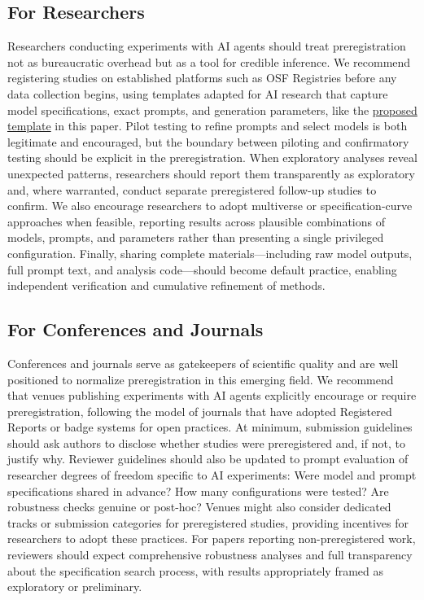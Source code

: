 \documentclass{article}
\theoremstyle{plain}
\theoremstyle{definition}
\theoremstyle{remark}
\begin{document}
\subsection{For Researchers}
Researchers conducting experiments with AI agents should treat preregistration not as bureaucratic overhead but as a tool for credible inference. We recommend registering studies on established platforms such as OSF Registries before any data collection begins, using templates adapted for AI research that capture model specifications, exact prompts, and generation parameters, like the \hyperlink{https://osf.io/5rc2h/overview?view_only=53e0a1748b4943e4989a2203a1ba9c81}{proposed template} in this paper. Pilot testing to refine prompts and select models is both legitimate and encouraged, but the boundary between piloting and confirmatory testing should be explicit in the preregistration. When exploratory analyses reveal unexpected patterns, researchers should report them transparently as exploratory and, where warranted, conduct separate preregistered follow-up studies to confirm. We also encourage researchers to adopt multiverse or specification-curve approaches when feasible, reporting results across plausible combinations of models, prompts, and parameters rather than presenting a single privileged configuration. Finally, sharing complete materials—including raw model outputs, full prompt text, and analysis code—should become default practice, enabling independent verification and cumulative refinement of methods.

\subsection{For Conferences and Journals}
Conferences and journals serve as gatekeepers of scientific quality and are well positioned to normalize preregistration in this emerging field. We recommend that venues publishing experiments with AI agents explicitly encourage or require preregistration, following the model of journals that have adopted Registered Reports or badge systems for open practices. At minimum, submission guidelines should ask authors to disclose whether studies were preregistered and, if not, to justify why. Reviewer guidelines should also be updated to prompt evaluation of researcher degrees of freedom specific to AI experiments: Were model and prompt specifications shared in advance? How many configurations were tested? Are robustness checks genuine or post-hoc? Venues might also consider dedicated tracks or submission categories for preregistered studies, providing incentives for researchers to adopt these practices. For papers reporting non-preregistered work, reviewers should expect comprehensive robustness analyses and full transparency about the specification search process, with results appropriately framed as exploratory or preliminary.
\end{document}
